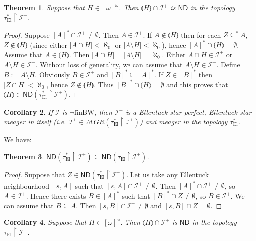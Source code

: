 \documentclass[12pt]{amsart}
\theoremstyle{plain}
\newtheorem{theorem}{Theorem}[section]
\newtheorem{corollary}[theorem]{Corollary}
\theoremstyle{definition}
\theoremstyle{remark}
\newcommand{\infsub}{[\omega]^{\omega}}
\newcommand{\meager}{{\mathcal MGR}}
\newcommand{\ND}{\mathsf{ND}}
\newcommand{\calI}{\mathcal{I}}
\newcommand{\EllentuckTopology}{\tau_\mathrm{El}}
\newcommand{\EllentuckTopologyStar}{\EllentuckTopology^*}
\newcommand{\lNawiasik}{\lParen}
\newcommand{\rNawiasik}{\rParen}
\newcommand{\notfinBW}{\neg \mathrm{finBW}}
\begin{document}
\begin{theorem}
  Suppose that $H \in \infsub$. Then
  $\lNawiasik H \rNawiasik \cap\calI^+$ is $\ND$ in the topology
  $\EllentuckTopologyStar\restriction\calI^+$.
\end{theorem}

\begin{proof}
  Suppose $[A]^*\cap\calI^+\not=\emptyset$.
Then $A\in \calI^+$. If $A\not\in \lNawiasik H \rNawiasik$
then for each $Z\subseteq^* A$, $Z \not\in \lNawiasik H \rNawiasik$
(since either $|A \cap H| < \aleph_0$ or $|A\setminus H| < \aleph_0$),
hence $[A]^* \cap  \lNawiasik H \rNawiasik = \emptyset$.
Assume that $A\in  \lNawiasik H \rNawiasik$. Then
$|A \cap H| = |A\setminus H| = \aleph_0$. Either
$A \cap H \in \calI^+$ or
$A \setminus H \in \calI^+$. Without loss of generality,
we can assume that $A\setminus H\in\calI^+$.
Define $B:= A\setminus H$. Obviously $B\in\calI^+$
and $[B]^*\subseteq [A]^*$. If $Z\in [B]^*$ then
$|Z \cap H| < \aleph_0$, hence
$Z\not\in\lNawiasik H \rNawiasik$.
Thus $[B]^* \cap \lNawiasik H \rNawiasik = \emptyset$
and this proves that
$\lNawiasik H \rNawiasik \in \ND(\EllentuckTopologyStar\restriction\calI^+)$.
\end{proof}

\begin{corollary}
  If $\calI$ is $\notfinBW$, then
$\calI^+$ is a Ellentuck star perfect, Ellentuck star meager in itself
(i.e. $\calI^+ \in \meager(\EllentuckTopologyStar \restriction \calI^+)$)
and meager in the topology $\EllentuckTopologyStar$. 
\end{corollary}

We have:
\begin{theorem}
  $\ND(\EllentuckTopologyStar\restriction\calI^+) \subseteq
   \ND(\EllentuckTopology\restriction\calI^+)$.
\end{theorem}
\begin{proof}
  Suppose that $Z \in \ND(\EllentuckTopologyStar\restriction\calI^+)$.
Let us take any Ellentuck neighbourhood $[s, A]$ such that
$[s, A] \cap \calI^+ \not= \emptyset$.
Then $[A]^* \cap \calI^+ \not= \emptyset$, so $A \in \calI^+$. Hence there exists
$B \in [A]^*$ such that $[B]^* \cap Z \not=\emptyset$, so $B \in \calI^+$.
We can assume that $B \subseteq A$. Then $[s, B] \cap \calI^+ \not= \emptyset$
and $[s, B] \cap Z = \emptyset$.
\end{proof}

\begin{corollary}
  Suppose that $H \in \infsub$. Then
  $\lNawiasik H \rNawiasik \cap\calI^+$ is $\ND$ in the topology
  $\EllentuckTopology\restriction\calI^+$.
\end{corollary}
\end{document}

